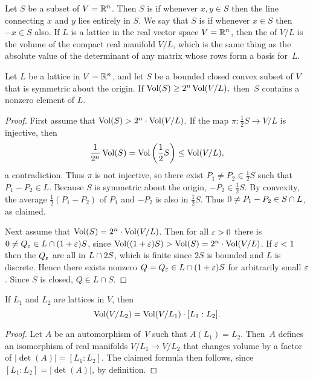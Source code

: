 Let $S$ be a subset of $V=\mathbb{R}^n$.  Then $S$ is  if
whenever $x,y\in S$ then the line connecting $x$ and $y$ lies entirely
in $S$.  We say that $S$ is  if
whenever $x\in S$ then $-x\in S$ also.  If $L$ is a lattice in the
real vector space $V=\mathbb{R}^n$, then the  of $V/L$ is the
volume of the compact real manifold $V/L$, which is the same thing as
the absolute value of the determinant of any matrix whose rows form a
basis for~$L$.
\begin{lemma}[Blichfeld]\label{lem:blichfeld}
Let $L$ be a lattice in $V=\mathbb{R}^n$, and let $S$ be a
bounded closed convex subset of $V$ that is symmetric about the
origin.  If 
$\operatorname{Vol}(S)\geq 2^n \operatorname{Vol}(V/L),$
then~$S$ contains a nonzero element of $L$.
\end{lemma}
\begin{proof}
First assume that $\operatorname{Vol}(S)>2^n\cdot \operatorname{Vol}(V/L)$.
If the map $\pi: \frac{1}{2}S \to V/L$ is injective, then 
$$\frac{1}{2^n}\operatorname{Vol}(S) = \operatorname{Vol}\left(\frac{1}{2} S\right)\leq \operatorname{Vol}(V/L),$$ 
a contradiction.  Thus $\pi$ is not injective, so there
exist $P_1\neq P_2\in \frac{1}{2}S$ such that $P_1-P_2\in L$.
Because $S$ is symmetric about the origin, $-P_2\in \frac{1}{2}S$.  By convexity,
the average $\frac{1}{2}(P_1-P_2)$ of $P_1$ and $-P_2$
is also in $\frac{1}{2}S$.  Thus $0\neq P_1-P_2 \in S\cap L$,
as claimed.

Next assume that $\operatorname{Vol}(S) = 2^n\cdot \operatorname{Vol}(V/L)$.  Then for all
$\varepsilon>0$ there is $0\neq Q_\varepsilon \in L\cap (1+\varepsilon) S$,
since $\operatorname{Vol}((1+\varepsilon)S)>\operatorname{Vol}(S)=2^n\cdot \operatorname{Vol}(V/L)$.
If $\varepsilon<1$ then the $Q_\varepsilon$ are all in $L\cap{} 2 S$,
which is finite since $2S$ is bounded and $L$ is discrete.
Hence there exists nonzero $Q=Q_\varepsilon\in L\cap{} (1+\varepsilon) S$ for arbitrarily
small $\varepsilon$.  Since $S$ is closed, $Q\in L\cap S$.
\end{proof}

\begin{lemma}\label{lem:latticevolchange}
If $L_1$ and $L_2$ are lattices in $V$, then 
\[
   \operatorname{Vol}(V/L_2) = \operatorname{Vol}(V/L_1) \cdot [L_1:L_2].
\]
\end{lemma}
\begin{proof}
Let $A$ be an automorphism of~$V$ such that $A(L_1)=L_2$.  Then~$A$
defines an isomorphism of real manifolds $V/L_1\to V/L_2$ that changes
volume by a factor of $|\det(A)|=[L_1:L_2]$.  The claimed
formula then follows, since $[L_1:L_2] = |\det(A)|$, by definition.
\end{proof}

